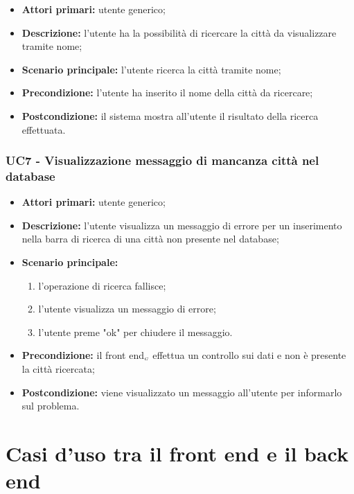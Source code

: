 \begin{itemize}
	\item \textbf{Attori primari:} utente generico;
	\item \textbf{Descrizione:} l’utente ha la possibilità di ricercare la città da visualizzare tramite nome;
	\item \textbf{Scenario principale:} l’utente ricerca la città tramite nome;
	\item \textbf{Precondizione:} l’utente ha inserito il nome della città da ricercare;
	\item \textbf{Postcondizione:} il sistema mostra all’utente il risultato della ricerca effettuata.
\end{itemize}

\subsubsection{UC7 - Visualizzazione messaggio di mancanza città nel database}\label{CasiDUsoCasiDUsoTraUnUtenteEIlFrontEndElencoCasiDUsoUC7VisualizzazioneMessaggioDiMancanzaCittàNelDatabase}

\begin{itemize}
	\item \textbf{Attori primari:} utente generico;
	\item \textbf{Descrizione:} l’utente visualizza un messaggio di errore per un inserimento nella barra di ricerca di una città non presente nel database;
	\item \textbf{Scenario principale:}
	\begin{enumerate}
		\item l’operazione di ricerca fallisce;
		\item l’utente visualizza un messaggio di errore;
		\item l’utente preme "ok" per chiudere il messaggio.
	\end{enumerate}
	\item \textbf{Precondizione:} il front end$_{\scaleto{G}{3pt}}$ effettua un controllo sui dati e non è presente la città ricercata;
	\item \textbf{Postcondizione:} viene visualizzato  un messaggio all’utente per informarlo sul problema.
\end{itemize}

\section{Casi d'uso tra il front end e il back end}\label{CasiDUsoCasiDUsoTraIlFrontEndEIlBackEnd}

